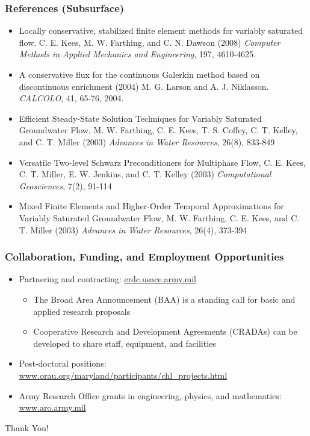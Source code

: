 \documentclass{beamer}
\begin{document}
\begin{frame}
  \frametitle{References (Subsurface)}
  \begin{footnotesize}
    \begin{itemize}
      
    \item Locally conservative, stabilized finite element methods for
      variably saturated flow. C. E. Kees, M. W. Farthing, and C. N.
      Dawson (2008) {\em Computer Methods in Applied Mechanics and
        Engineering}, 197, 4610-4625.
      
    \item A conservative flux for the continuous Galerkin method based
      on discontinuous enrichment (2004) M. G. Larson and
      A. J. Niklasson. {\em CALCOLO}, 41, 65-76, 2004.
      
    \item Efficient Steady-State Solution Techniques for Variably
      Saturated Groundwater Flow, M. W. Farthing, C. E. Kees,
      T. S. Coffey, C. T. Kelley, and C. T.  Miller (2003) {\em Advances
        in Water Resources}, 26(8), 833-849
      
    \item Versatile Two-level Schwarz Preconditioners for Multiphase Flow,
      C. E. Kees, C. T. Miller, E. W. Jenkins, and C. T. Kelley (2003)
      {\em Computational Geosciences}, 7(2), 91-114
      
    \item Mixed Finite Elements and Higher-Order Temporal Approximations
      for Variably Saturated Groundwater Flow, M. W. Farthing, C. E. Kees,
      and C. T. Miller (2003) {\em Advances in Water Resources}, 26(4),
      373-394
    \end{itemize}
  \end{footnotesize}
\end{frame}

\begin{frame}
  \frametitle{Collaboration, Funding, and Employment Opportunities}
  \begin{itemize}
  \item Partnering and contracting: {\footnotesize
    \url{erdc.usace.army.mil}}
\begin{itemize}
  \item The Broad Area Announcement (BAA) is a standing call for basic
    and applied research proposals
  \item Cooperative Research and Development Agreements (CRADAs) can
    be developed to share staff, equipment, and facilities
\end{itemize}
  \item Post-doctoral positions:\\ {\footnotesize
    \url{www.orau.org/maryland/participants/chl\_projects.html}}
  \item Army Research Office grants in engineering, physics, and
    mathematics:\\ {\footnotesize \url{www.aro.army.mil}}
  \end{itemize}
\begin{center} \large \alert{Thank You!} \end{center}
\end{frame}
\end{document}
